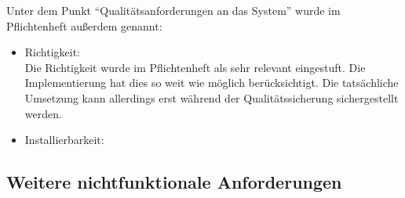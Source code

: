 \documentclass[parskip=full]{scrartcl}
\begin{document}
		Unter dem Punkt \enquote{Qualitätsanforderungen an das System} wurde im Pflichtenheft außerdem genannt:
		\begin{itemize}
		\item Richtigkeit: \\
		Die Richtigkeit wurde im Pflichtenheft als sehr relevant eingestuft. Die Implementierung hat dies so weit wie möglich berücksichtigt. Die tatsächliche Umsetzung kann allerdings erst während der Qualitätssicherung sichergestellt werden.
		\item Installierbarkeit: \\
		
		\end{itemize}
		
		\subsection{Weitere nichtfunktionale Anforderungen}
\end{document}
